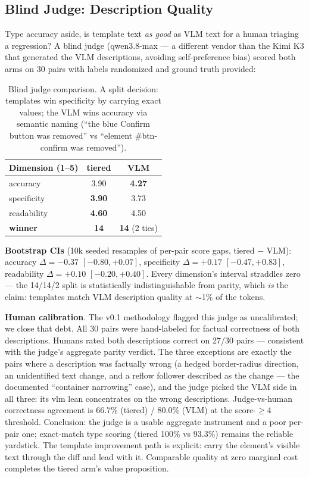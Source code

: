 \documentclass[10pt,twocolumn,letterpaper]{article}
\begin{document}
\subsection{Blind Judge: Description Quality}

Type accuracy aside, is template text \textit{as good} as VLM text for a human triaging a regression? A blind judge (qwen3.8-max — a different vendor than the Kimi K3 that generated the VLM descriptions, avoiding self-preference bias) scored both arms on 30 pairs with labels randomized and ground truth provided:

\begin{table}[h]
\centering
\small
\begin{tabular}{lcc}
\toprule
\textbf{Dimension (1--5)} & \textbf{tiered} & \textbf{VLM} \\
\midrule
accuracy & 3.90 & \textbf{4.27} \\
specificity & \textbf{3.90} & 3.73 \\
readability & \textbf{4.60} & 4.50 \\
\midrule
\textbf{winner} & \textbf{14} & \textbf{14} (2 ties) \\
\bottomrule
\end{tabular}
\caption{Blind judge comparison. A split decision: templates win specificity by carrying exact values; the VLM wins accuracy via semantic naming (``the blue Confirm button was removed'' vs ``element \#btn-confirm was removed'').}
\label{tab:judge}
\end{table}

\textbf{Bootstrap CIs} (10k seeded resamples of per-pair score gaps, tiered $-$ VLM): accuracy $\Delta=-0.37$ $[-0.80,+0.07]$, specificity $\Delta=+0.17$ $[-0.47,+0.83]$, readability $\Delta=+0.10$ $[-0.20,+0.40]$. Every dimension's interval straddles zero — the 14/14/2 split is statistically indistinguishable from parity, which \textit{is} the claim: templates match VLM description quality at ${\sim}$1\% of the tokens.

\textbf{Human calibration}. The v0.1 methodology flagged this judge as uncalibrated; we close that debt. All 30 pairs were hand-labeled for factual correctness of both descriptions. Humans rated both descriptions correct on 27/30 pairs — consistent with the judge's aggregate parity verdict. The three exceptions are exactly the pairs where a description was factually wrong (a hedged border-radius direction, an unidentified text change, and a reflow follower described as the change — the documented ``container narrowing'' case), and the judge picked the VLM side in all three: its vlm lean concentrates on the wrong descriptions. Judge-vs-human correctness agreement is 66.7\% (tiered) / 80.0\% (VLM) at the score-$\geq$4 threshold. Conclusion: the judge is a usable aggregate instrument and a poor per-pair one; exact-match type scoring (tiered 100\% vs 93.3\%) remains the reliable yardstick. The template improvement path is explicit: carry the element's visible text through the diff and lead with it. Comparable quality at zero marginal cost completes the tiered arm's value proposition.
\end{document}
